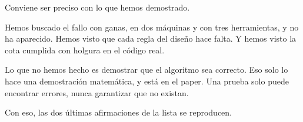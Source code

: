 Conviene ser preciso con lo que hemos demostrado.

Hemos buscado el fallo con ganas, en dos máquinas y con tres herramientas, y no ha aparecido. Hemos visto que cada regla del diseño hace falta. Y hemos visto la cota cumplida con holgura en el código real.

Lo que no hemos hecho es demostrar que el algoritmo sea correcto. Eso solo lo hace una demostración matemática, y está en el paper. Una prueba solo puede encontrar errores, nunca garantizar que no existan.

Con eso, las dos últimas afirmaciones de la lista se reproducen.
